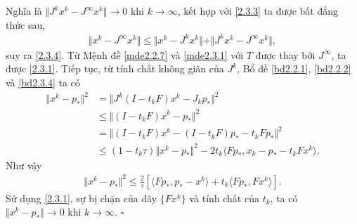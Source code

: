 \documentclass[14pt, oneside,A4paper]{book}
\theoremstyle{plain}
\newcommand{\eproof}{\hfill $\square$}
\begin{document}
Nghĩa là $\Vert J^{k}x^{k}-J^{\infty}x^{k} \Vert \rightarrow 0$ khi $k \rightarrow \infty$, kết hợp với \eqref{2.3.3} ta được bất đẳng thức sau,
\begin{align*}
\Vert x^{k}-J^{\infty}x^{k} \Vert \leq \Vert x^{k}-J^{k}x^{k} \Vert + \Vert J^{k}x^{k}-J^{\infty}x^{k} \Vert,
\end{align*}
suy ra \eqref{2.3.4}. Từ Mệnh đề \ref{mde2.2.7} và \ref{mde2.3.1} với $T$ được thay bởi $J^{\infty}$, ta được \eqref{2.3.1}. Tiếp tục, từ tính chất không giãn của $J^{k}$, Bổ đề \ref{bd2.2.1}, \ref{bd2.2.2} và \ref{bd2.3.4}  ta có
\begin{align*}
\Vert x^{k} - p_{*} \Vert^{2} &= \Vert J^{k}(I-t_{k}F)x^{k} - J_{k}p_{*} \Vert^{2} \\
&\leq  \Vert (I-t_{k}F)x^{k} - p_{*} \Vert^{2} \\
&=\Vert (I-t_{k}F)x^{k} - (I-t_{k}F)p_{*} - t_{k}Fp_{*} \Vert^{2} \\
&\leq (1-t_{k}\tau)\Vert x^{k}-p_{*} \Vert^{2} - 2t_{k} \langle Fp_{*},x_{k}-p_{*}-t_{k}Fx^{k} \rangle.
\end{align*}
Như vậy
\begin{align*}
\Vert x^{k}-p_{*}\Vert^{2} \leq \frac{2}{\tau}[\langle Fp_{*},p_{*}-x^{k} \rangle+ t_{k}\langle Fp_{*},Fx^{k} \rangle].
\end{align*}
Sử dụng \eqref{2.3.1}, sự bị chặn của dãy $\lbrace Fx^{k} \rbrace$ và tính chất của $t_{k}$, ta có \\$\Vert x^{k}-p_{*}\Vert \rightarrow 0$ khi $k\rightarrow \infty$.
\eproof
\end{document}
